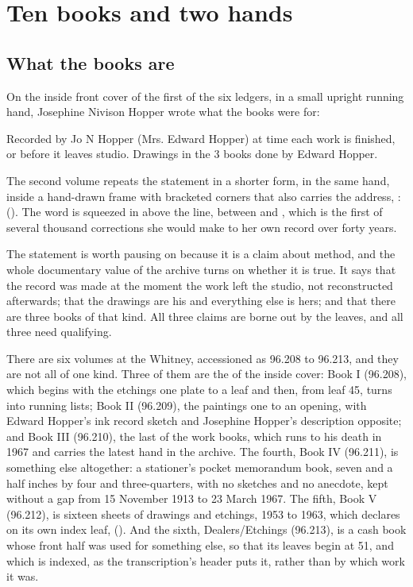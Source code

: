 \chapter{Ten books and two hands}

\section{What the books are}

On the inside front cover of the first of the six ledgers, in a small upright running hand, Josephine Nivison Hopper wrote what the books were for:

\begin{leafquote}
Recorded by Jo N Hopper (Mrs. Edward Hopper) at time each work is finished, or before it leaves studio. Drawings in the 3 books done by Edward Hopper.
\end{leafquote}

\noindent The second volume repeats the statement in a shorter form, in the same hand, inside a hand-drawn frame with bracketed corners that also carries the address, :  (). The word  is squeezed in above the line, between  and , which is the first of several thousand corrections she would make to her own record over forty years.

The statement is worth pausing on because it is a claim about method, and the whole documentary value of the archive turns on whether it is true. It says that the record was made at the moment the work left the studio, not reconstructed afterwards; that the drawings are his and everything else is hers; and that there are three books of that kind. All three claims are borne out by the leaves, and all three need qualifying.

There are six volumes at the Whitney, accessioned as 96.208 to 96.213, and they are not all of one kind. Three of them are the  of the inside cover: Book I (96.208), which begins with the etchings one plate to a leaf and then, from leaf 45, turns into running lists; Book II (96.209), the paintings one to an opening, with Edward Hopper's ink record sketch and Josephine Hopper's description opposite; and Book III (96.210), the last of the work books, which runs to his death in 1967 and carries the latest hand in the archive. The fourth, Book IV (96.211), is something else altogether: a stationer's pocket memorandum book, seven and a half inches by four and three-quarters, with no sketches and no anecdote, kept without a gap from 15 November 1913 to 23 March 1967. The fifth, Book V (96.212), is sixteen sheets of drawings and etchings, 1953 to 1963, which declares on its own index leaf,  (). And the sixth, Dealers/Etchings (96.213), is a cash book whose front half was used for something else, so that its leaves begin at 51, and which is indexed, as the transcription's header puts it,  rather than by which work it was.


